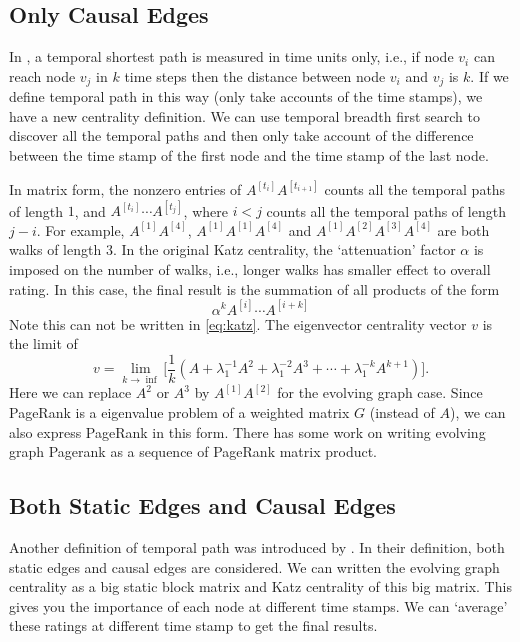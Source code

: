 \documentclass[12pt]{article}
\theoremstyle{definition}
\begin{document}
\subsection{Only Causal Edges}
\label{sec:only-causal-edges}

In \cite{tang10s}, a temporal shortest path is measured in time units only, i.e., if node
$v_i$ can reach node $v_j$ in $k$ time steps then the distance between node
$v_i$ and $v_j$ is $k$. If we define temporal path in this way (only take accounts of the time stamps), we have a new centrality definition. 
We can use temporal breadth first
search \cite{chen16} to discover all the temporal paths and then only take account of the difference between the time stamp of the first node and the time stamp of the last node.

In matrix form, the nonzero entries of $A^{[t_i]} A^{[t_{i+1}]}$ counts all the temporal paths of length $1$, and 
$A^{[t_i]}\cdots A^{[t_j]}$, where $i < j$ counts all the temporal paths of length $j -i$. 
For example, $A^{[1]}A^{[4]}$, $A^{[1]}A^{[1]}A^{[4]}$ and $A^{[1]}A^{[2]}A^{[3]}A^{[4]}$ are both walks of length 3.
In the original Katz centrality, the `attenuation' factor $\alpha$ is imposed on the
number of walks, i.e., longer walks has smaller effect to overall rating. In this case, the final result is the summation of all products of the form
\[
\alpha^k A^{[i]} \cdots A^{[i+k]}
\]
Note this can not be written in \eqref{eq:katz}. The eigenvector centrality vector $v$ is the limit of
\[
v = \lim_{k \rightarrow \inf}\big[ \frac{1}{k} (A + \lambda_1^{-1} A^2 + \lambda_1^{-2}A^3 + \cdots + \lambda_1^{-k}A^{k+1})\big].
\]
Here we can replace $A^2$ or $A^3$ by $A^{[1]}A^{[2]}$ for the evolving graph case.
Since PageRank is a eigenvalue problem of a weighted matrix $G$ (instead of $A$),
 we can also express PageRank in this form. There has some work on writing evolving graph Pagerank as a sequence of PageRank matrix product.

\subsection{Both Static Edges and Causal Edges}
\label{sec:both-static-edges}

Another definition of temporal path was introduced by \cite{chen16}. In their definition,
both static edges and causal edges are considered. We can written the evolving graph centrality as a big static block matrix and Katz centrality of this big matrix. This gives you the importance of each node at different time stamps. We can `average' these ratings at different time stamp to get the final results.
\end{document}
